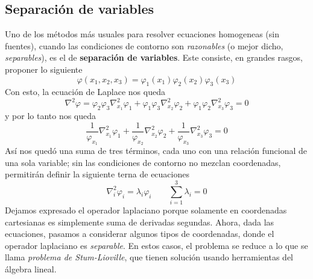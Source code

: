 \documentclass[a4paper]{article}
\numberwithin{equation}{section} %
\begin{document}
\subsection{Separación de variables}
Uno de los métodos más usuales para resolver ecuaciones homogeneas (sin fuentes), cuando las condiciones de contorno son \emph{razonables} (o mejor dicho, \emph{separables}), es el de \textbf{separación de variables}. Este consiste, en grandes rasgos, proponer lo siguiente
\begin{equation}
  \varphi(x_1, x_2, x_3) = \varphi_{1}(x_1) \varphi_{2}(x_2) \varphi_{3}(x_3)
  \label{eq:separacion_variables_multiplicacion}
\end{equation}
Con esto, la ecuación de Laplace nos queda
\begin{equation}
  \nabla^2 \varphi =  \varphi_2  \varphi_3 \nabla_{x_1}^2 \varphi_1 +  \varphi_1  \varphi_3 \nabla_{x_2}^2 \varphi_2 +   \varphi_1  \varphi_2 \nabla_{x_3}^2 \varphi_3 = 0
\end{equation}
y por lo tanto nos queda
\begin{equation}
   \frac{1}{\varphi_{x_1}} \nabla_{x_1}^2 \varphi_1 +   \frac{1}{\varphi_{x_2}} \nabla_{x_2}^2 \varphi_2 + \frac{1}{\varphi_{x_3}} \nabla_{x_3}^2 \varphi_3 = 0
\end{equation}
Así nos quedó una suma de tres términos, cada uno con una relación funcional de una sola variable; sin las condiciones de contorno no mezclan coordenadas, permitirán definir la siguiente terna de ecuaciones
\begin{equation}
 \nabla_i^2 \varphi_i = \lambda_i \varphi_i \qquad \sum^3_{i = 1} \lambda_i = 0
 \label{eq:separacion_variables_ecuacion}
\end{equation}
Dejamos expresado el operador laplaciano porque solamente en coordenadas cartesianas es simplemente suma de derivadas segundas. Ahora, dada las ecuaciones, pasamos a considerar algunos tipos de coordenadas, donde el operador laplaciano es \emph{separable}. En estos casos, el problema se reduce a lo que se llama \emph{problema de Stum-Lioville}, que tienen solución usando herramientas del álgebra lineal.
\end{document}

